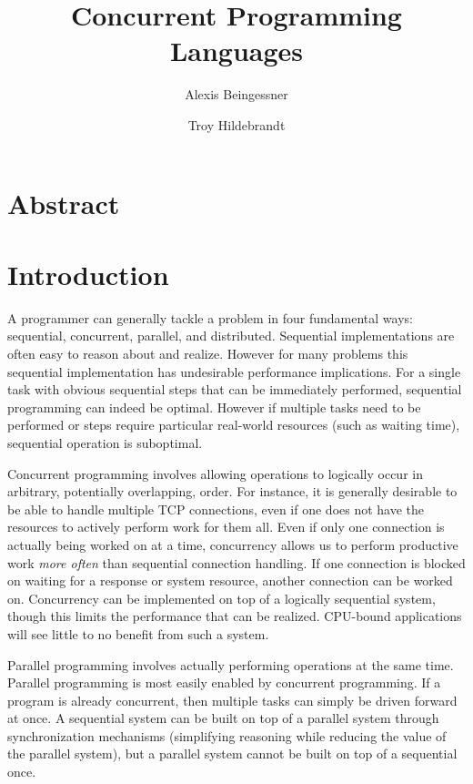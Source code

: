 \documentclass[10pt,a4paper]{article}
\begin{document}
\title{Concurrent Programming Languages}

\author{
Alexis Beingessner
\and
Troy Hildebrandt
}

\maketitle

\section{Abstract}





\section{Introduction}

A programmer can generally tackle a problem in four fundamental ways:
sequential, concurrent, parallel, and distributed. Sequential implementations
are often easy to reason about and realize. However for many problems this
sequential implementation has undesirable performance implications. For a
single task with obvious sequential steps that can be immediately performed,
sequential programming can indeed be optimal. However if multiple tasks need to
be performed or steps require particular real-world resources (such as waiting
time), sequential operation is suboptimal.

Concurrent programming involves allowing operations to logically occur in
arbitrary, potentially overlapping, order. For instance, it is generally
desirable to be able to handle multiple TCP connections, even if one does not
have the resources to actively perform work for them all. Even if only one
connection is actually being worked on at a time, concurrency allows us to
perform productive work \emph{more often} than sequential connection handling.
If one connection is blocked on waiting for a response or system resource,
another connection can be worked on. Concurrency can be implemented on top of a
logically sequential system, though this limits the performance that can be
realized. CPU-bound applications will see little to no benefit from such a
system.

Parallel programming involves actually performing operations at the same time.
Parallel programming is most easily enabled by concurrent programming. If a
program is already concurrent, then multiple tasks can simply be driven forward
at once. A sequential system can be built on top of a parallel system through
synchronization mechanisms (simplifying reasoning while reducing the value of
the parallel system), but a parallel system cannot be built on top of a
sequential once.
\end{document}
